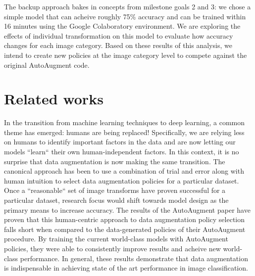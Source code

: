 \documentclass[10pt,twocolumn,letterpaper]{article}
\begin{document}
	The backup approach bakes in concepts from milestone goals 2 and 3: we chose a simple model that can acheive roughly 75\% accuracy and can be trained within 16 minutes using the Google Colaboratory  environment. We are exploring the effects of individual transformation on this model to evaluate how accuracy changes for each image category. Based on these results of this analysis, we intend to create new policies at the image category level to compete against the original AutoAugment code. 
	

\section{Related works}

	In the transition from machine learning techniques to deep learning, a common theme has emerged: humans are being replaced! Specifically, we are relying less on humans to identify important factors in the data and are now letting our models ``learn`` their own human-independent factors. In this context, it is no surprise that data augmentation is now making the same transition. The canonical approach has been to use a combination of trial and error along with human intuition to select data augmentation policies for a particular dataset. Once a ``reasonable`` set of image transforms have proven successful for a particular dataset, research focus would shift towards model design as the primary means to increase accuracy. The results of the AutoAugment paper have proven that this human-centric approach to data augmentation policy selection falls short when compared to the data-generated policies of their AutoAugment procedure. By training the current world-class models with AutoAugment policies, they were able to consistently improve results and acheive new world-class performance. In general, these results demonstrate that data augmentation is indispensable in achieving state of the art performance in image classification. 
\end{document}
